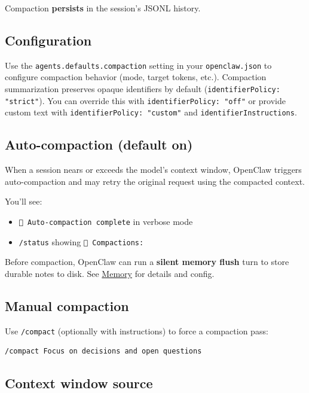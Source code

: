 Compaction \textbf{persists} in the session’s JSONL history.

\subsection{Configuration}


Use the \texttt{agents.defaults.compaction} setting in your \texttt{openclaw.json} to configure compaction behavior (mode, target tokens, etc.).
Compaction summarization preserves opaque identifiers by default (\texttt{identifierPolicy: "strict"}). You can override this with \texttt{identifierPolicy: "off"} or provide custom text with \texttt{identifierPolicy: "custom"} and \texttt{identifierInstructions}.

\subsection{Auto-compaction (default on)}


When a session nears or exceeds the model’s context window, OpenClaw triggers auto-compaction and may retry the original request using the compacted context.

You’ll see:

\begin{itemize}
  \item \texttt{🧹 Auto-compaction complete} in verbose mode
  \item \texttt{/status} showing \texttt{🧹 Compactions: }
\end{itemize}


Before compaction, OpenClaw can run a \textbf{silent memory flush} turn to store
durable notes to disk. See \href{/concepts/memory}{Memory} for details and config.

\subsection{Manual compaction}


Use \texttt{/compact} (optionally with instructions) to force a compaction pass:

\begin{lstlisting}
/compact Focus on decisions and open questions
\end{lstlisting}


\subsection{Context window source}


